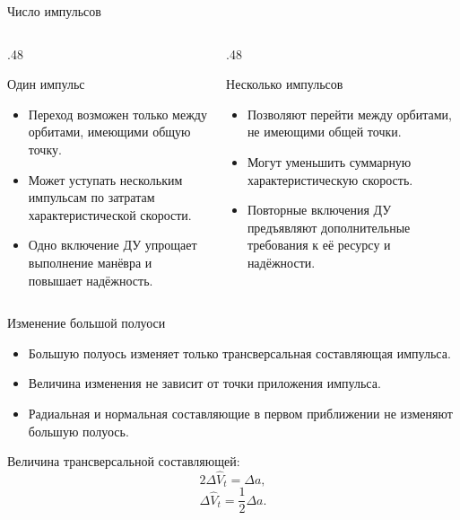 \documentclass[11pt,aspectratio=169,t]{beamer}
\begin{document}
\begin{frame}{Число импульсов}
\relax
\begin{columns}[T,onlytextwidth]
\begin{column}{.48\textwidth}
\begin{block}{Один импульс}
\begin{itemize}
 \setlength{\itemsep}{5pt}
 \item Переход возможен только между орбитами, имеющими общую точку.
 \item Может уступать нескольким импульсам по затратам характеристической скорости.
 \item Одно включение ДУ упрощает выполнение манёвра и повышает надёжность.
\end{itemize}
\end{block}
\end{column}
\begin{column}{.48\textwidth}
\begin{block}{Несколько импульсов}
\begin{itemize}
 \setlength{\itemsep}{5pt}
 \item Позволяют перейти между орбитами, не имеющими общей точки.
 \item Могут уменьшить суммарную характеристическую скорость.
 \item Повторные включения ДУ предъявляют дополнительные требования к её ресурсу и надёжности.
\end{itemize}
\end{block}
\end{column}
\end{columns}
\end{frame}

\begin{frame}{Изменение большой полуоси}
\relax
\begin{itemize}
 \setlength{\itemsep}{7pt}
 \item Большую полуось изменяет только трансверсальная составляющая импульса.
 \item Величина изменения не зависит от точки приложения импульса.
 \item Радиальная и нормальная составляющие в первом приближении не изменяют большую полуось.
\end{itemize}
\medskip
Величина трансверсальной составляющей:
\[
 2\Delta\widehat V_t=\Delta a,
\]
\[
 \boxed{\Delta\widehat V_t=\frac12\Delta a.}
\]
\end{frame}
\end{document}
